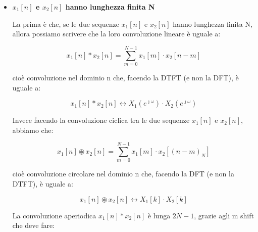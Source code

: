 \begin{itemize}

\item \textbf{$x_1 \left[ n \right]$ e $x_2 \left[ n \right]$ hanno lunghezza finita N} \newline 

La prima è che, se le due sequenze $x_1 \left[ n \right]$ e $x_2 \left[ n \right]$ hanno lunghezza finita N, 
allora possiamo scrivere che la loro convoluzione lineare è uguale a: 

{
    \Large 
    \begin{equation}
        x_1 \left[ n \right]
        *
        x_2 \left[ n \right] 
        = 
        \sum_{m = 0}^{N - 1}
        x_1 \left[ m \right]
        \cdot 
        x_2 \left[ n - m \right]
    \end{equation}
}

cioè convoluzione nel dominio n che, facendo la DTFT (e non la DFT), è uguale a: 

{
    \Large 
    \begin{equation}
        x_1 \left[ n \right]
        *
        x_2 \left[ n \right] 
        \leftrightarrow
        X_1 \left(e^{\jmath \omega}\right)
        \cdot
        X_2 \left(e^{\jmath \omega}\right) 
    \end{equation}
}

Invece facendo la convoluzione ciclica tra le due sequenze $x_1 \left[ n \right]$ e $x_2 \left[ n \right]$, 
abbiamo che: 

{
    \Large 
    \begin{equation}
        x_1 \left[ n \right]
        \circledast
        x_2 \left[ n \right]
        = 
        \sum_{m = 0}^{N - 1}
        x_1 \left[ m \right]
        \cdot 
        x_2 \left[ \left(n - m \right)_{N} \right]
    \end{equation}
}

cioè convoluzione circolare nel dominio n che, facendo la DFT (e non la DTFT), è uguale a: 

{
    \Large 
    \begin{equation}
        x_1 \left[ n \right]
        \circledast
        x_2 \left[ n \right] 
        \leftrightarrow
        X_1 \left[ k\right]
        \cdot
        X_2 \left[ k\right] 
    \end{equation}
}

La convoluzione aperiodica $ x_1 \left[ n \right] * x_2 \left[ n \right] $ è lunga $2 N - 1$, 
grazie agli m shift che deve fare: 


\end{itemize}
